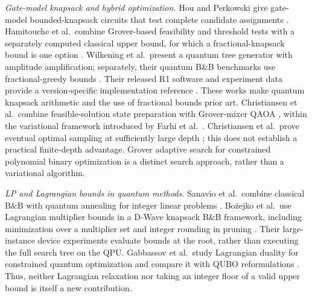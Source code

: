\documentclass[conference]{IEEEtran}
\begin{document}
\textit{Gate-model knapsack and hybrid optimization.} Hou and Perkowski give gate-model bounded-knapsack circuits that test complete candidate assignments \cite{hou2020}. Hamitouche et al.\ combine Grover-based feasibility and threshold tests with a separately computed classical upper bound, for which a fractional-knapsack bound is one option \cite{hamitouche2025}. Wilkening et al.\ present a quantum tree generator with amplitude amplification; separately, their quantum B\&B benchmarks use fractional-greedy bounds \cite{wilkening2025}. Their released R1 software and experiment data provide a version-specific implementation reference \cite{wilkening2025code}. These works make quantum knapsack arithmetic and the use of fractional bounds prior art. Christiansen et al.\ combine feasible-solution state preparation with Grover-mixer QAOA \cite{ref23}, within the variational framework introduced by Farhi et al.\ \cite{ref25}. Christiansen et al.\ prove eventual optimal sampling at sufficiently large depth \cite{ref23}; this does not establish a practical finite-depth advantage. Grover adaptive search for constrained polynomial binary optimization \cite{ref26} is a distinct search approach, rather than a variational algorithm.

\textit{LP and Lagrangian bounds in quantum methods.} Sanavio et al.\ combine classical B\&B with quantum annealing for integer linear problems \cite{ref36}. Bo\.{z}ejko et al.\ use Lagrangian multiplier bounds in a D-Wave knapsack B\&B framework, including minimization over a multiplier set and integer rounding in pruning \cite{bozejko2026}. Their large-instance device experiments evaluate bounds at the root, rather than executing the full search tree on the QPU. Gabbassov et al.\ study Lagrangian duality for constrained quantum optimization and compare it with QUBO reformulations \cite{gabbassov2025}. Thus, neither Lagrangian relaxation nor taking an integer floor of a valid upper bound is itself a new contribution.
\end{document}
